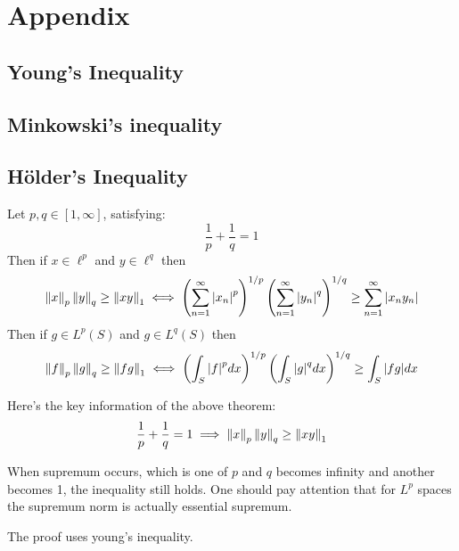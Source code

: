 \newpage
\section{Appendix}

\subsection{Young's Inequality}\label{Young's Inequality}
\placeholder

\subsection{Minkowski's inequality}\label{Minkowski-holder}
\placeholder


\subsection{Hölder's Inequality}\label{Hölder's inequality}
\begin{theorem}\rm\nextline
Let $p,q\in[1,\infty]$,	satisfying:
$$
\frac{1}{p}+\frac{1}{q}=1
$$
Then if $x\in\ell^p$ and $y\in\ell^q$ then 
$$
\left\|{x}\right\|_p\left\|{y}\right\|_q\geq\left\|{xy}\right\|_1
\iff
\left(\sum_{n=1}^\infty{|x_n|}^p\right)^{1/p}
\left(\sum_{n=1}^\infty{|y_n|}^q\right)^{1/q}\geq\sum_{n=1}^\infty|x_ny_n|
$$
Then if $g\in L^p(S)$ and $g\in L^q(S)$ then 
$$
\left\|{f}\right\|_p\left\|{g}\right\|_q\geq\left\|{fg}\right\|_1
\iff
\left(\int_S{|f|}^pdx\right)^{1/p}
\left(\int_S{|g|}^qdx\right)^{1/q}
\geq\int_S|fg|dx
$$
\end{theorem}
\begin{remark}\rm\nextline
Here's the key information of the above theorem:
$$
\frac{1}{p}+\frac{1}{q}=1\implies \left\|{x}\right\|_p\left\|{y}\right\|_q\geq\left\|{xy}\right\|_1
$$
\end{remark}
\begin{remark}
When supremum occurs, which is  one of $p$ and $q$ becomes infinity and another becomes 1, the inequality still holds. One should pay attention that for $L^p$ spaces the supremum norm is actually essential supremum.
\end{remark}

\begin{remark}\rm\nextline
The proof uses young's inequality.\\
\placeholder
\end{remark}

